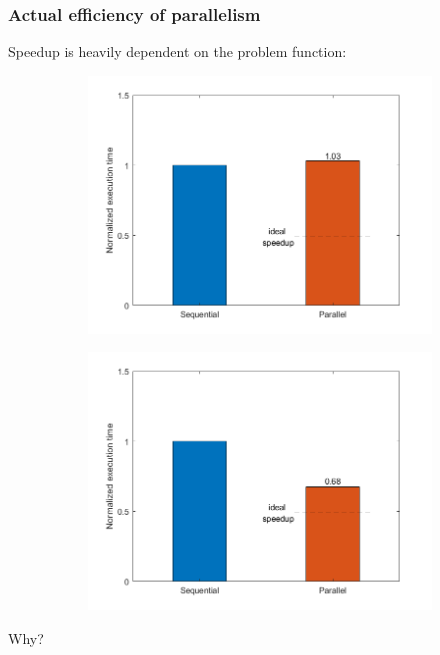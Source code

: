 \documentclass{beamer}
\begin{document}
\begin{frame} %
	\frametitle{Actual efficiency of parallelism}
	Speedup is heavily dependent on the problem function:
	\begin{figure}
		\begin{subfigure}{.5\textwidth}
			\includegraphics[width=\linewidth]{etc/test5_2.jpeg}
		\end{subfigure}%
		\begin{subfigure}{.5\textwidth}
			\includegraphics[width=\linewidth]{etc/test6_2.jpeg}
		\end{subfigure}%
	\end{figure}
	\begin{center}
		Why?
	\end{center}
	
\end{frame}
\end{document}
